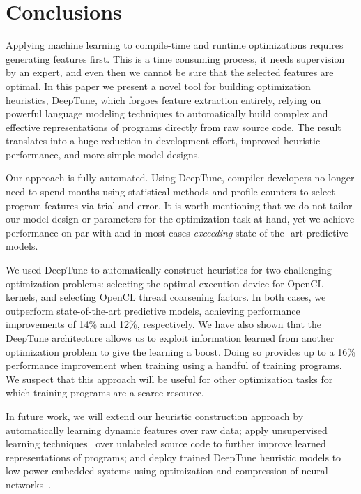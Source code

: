 \section{Conclusions} \label{sec:conclusion}

Applying machine learning to compile-time and runtime optimizations requires
generating features first. This is a time consuming process, it needs
supervision by an expert, and even then we cannot be sure that the selected
features are optimal. In this paper we present a novel tool for building
optimization heuristics, DeepTune, which forgoes feature extraction entirely,
relying on powerful language modeling techniques to automatically build complex
and effective representations of programs directly from raw source code. The
result translates into a huge reduction in development effort, improved
heuristic performance, and more simple model designs.

Our approach is fully automated. Using DeepTune, compiler developers no longer
need to spend months using statistical methods and profile counters to select
program features via trial and error.  It is worth mentioning that we do not
tailor our model design or parameters for the optimization task at hand, yet we
achieve performance on par with and in most cases \emph{exceeding} state-of-the-
art predictive models.

We used DeepTune to automatically construct heuristics for two challenging
optimization problems: selecting the optimal execution device for OpenCL
kernels, and selecting OpenCL thread coarsening factors. In both cases, we
outperform state-of-the-art predictive models, achieving performance
improvements of 14\% and 12\%, respectively. We have also shown that the
DeepTune architecture allows us to exploit information learned from another
optimization problem to give the learning a boost. Doing so provides up to a
16\% performance improvement when training using a handful of training programs.
We suspect that this approach will be useful for other optimization tasks for
which training programs are a scarce resource.

In future work, we will extend our heuristic construction approach by
automatically learning dynamic features over raw data; apply unsupervised
learning techniques~\cite{Le2012} over unlabeled source code to further improve
learned representations of programs; and deploy trained DeepTune heuristic
models to low power embedded systems using optimization and compression of
neural networks~\cite{Han2015}.
